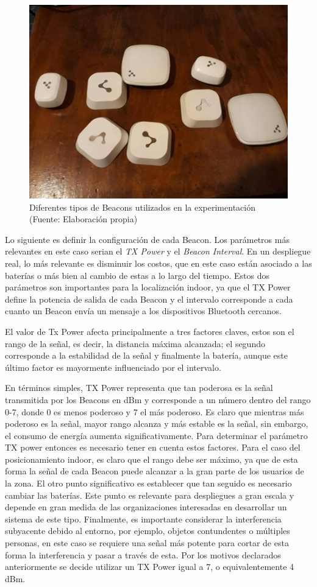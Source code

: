 \begin{figure}[ht!]
\centering
\includegraphics[width=.6\textwidth]{figures/beacons_all.jpg}
\caption[Beacons utilizados en la experimentación]{Diferentes tipos de Beacons utilizados en la experimentación \\
{\scriptsize (Fuente: Elaboración propia)}}
\label{fig:propuesta}
\end{figure}

Lo siguiente es definir la configuración de cada Beacon. Los parámetros más relevantes en este caso serian el \textit{TX Power} y el \textit{Beacon Interval}. En un despliegue real, lo más relevante es disminuir los costos, que en este caso están asociado a las baterías o más bien al cambio de estas a lo largo del tiempo. Estos dos parámetros son importantes para la localización indoor, ya que el TX Power define la potencia de salida de cada Beacon y el intervalo corresponde a cada cuanto un Beacon envía un mensaje a los dispositivos Bluetooth cercanos. 

El valor de Tx Power afecta principalmente a tres factores claves, estos son el rango de la señal, es decir, la distancia máxima alcanzada; el segundo corresponde a la estabilidad de la señal y finalmente la batería, aunque este último factor es mayormente influenciado por el intervalo.

En términos simples, TX Power representa que tan poderosa es la señal transmitida por los Beacons en dBm y corresponde a un número dentro del rango 0-7, donde 0 es menos poderoso y 7 el más poderoso. Es claro que mientras más poderoso es la señal, mayor rango alcanza y más estable es la señal, sin embargo, el consumo de energía aumenta significativamente. Para determinar el parámetro TX power entonces es necesario tener en cuenta estos factores. Para el caso del posicionamiento indoor, es claro que el rango debe ser máximo, ya que de esta forma la señal de cada Beacon puede alcanzar a la gran parte de los usuarios de la zona. El otro punto significativo es establecer que tan seguido es necesario cambiar las baterías. Este punto es relevante para despliegues a gran escala y depende en gran medida de las organizaciones interesadas en desarrollar un sistema de este tipo. Finalmente, es importante considerar la interferencia subyacente debido al entorno, por ejemplo, objetos contundentes o múltiples personas, en este caso se requiere una señal más potente para cortar de esta forma la interferencia y pasar a través de esta. Por los motivos declarados anteriormente se decide utilizar un TX Power igual a 7, o equivalentemente 4 dBm.

